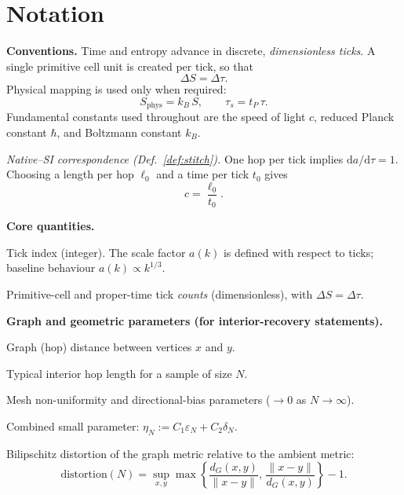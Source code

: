 \section*{Notation}

\noindent\textbf{Conventions.}  
Time and entropy advance in discrete, \emph{dimensionless ticks}.   
A single primitive cell unit is created per tick, so that
\[
  \Delta S = \Delta \tau.
\]
Physical mapping is used only when required:
\[
  S_{\mathrm{phys}} = k_B\,S, \qquad \tau_s = t_P\,\tau.
\]
Fundamental constants used throughout are the speed of light \(c\), reduced Planck constant \(\hbar\), and Boltzmann constant \(k_B\).

\smallskip
\noindent\textit{Native--SI correspondence (Def.~\ref{def:stitch}).}  
One hop per tick implies \(\mathrm{d}a/\mathrm{d}\tau = 1\).  
Choosing a length per hop \(\ell_0\) and a time per tick \(t_0\) gives
\[
  c = \frac{\ell_0}{t_0}.
\]

\bigskip
\noindent\textbf{Core quantities.}
\begin{description}[leftmargin=2.4em,labelsep=0.8em]
  \item[\(k\)] Tick index (integer). The scale factor \(a(k)\) is defined with respect to ticks; baseline behaviour \(a(k) \propto k^{1/3}\).
  \item[\(\Delta S,\, \Delta\tau\)] Primitive-cell and proper-time tick \emph{counts} (dimensionless), with \(\Delta S = \Delta\tau\).
\end{description}

\noindent\textbf{Graph and geometric parameters (for interior-recovery statements).}
\begin{description}[leftmargin=2.4em,labelsep=0.8em]
  \item[\(d_G(x,y)\)] Graph (hop) distance between vertices \(x\) and \(y\).
  \item[\(\ell_N\)] Typical interior hop length for a sample of size \(N\).
  \item[\(\varepsilon_N,\,\delta_N\)] Mesh non-uniformity and directional-bias parameters (\(\to 0\) as \(N \to \infty\)).
  \item[\(\eta_N\)] Combined small parameter: \(\eta_N := C_1\varepsilon_N + C_2\delta_N.\)
  \item[\(\mathrm{distortion}(N)\)] Bilipschitz distortion of the graph metric relative to the ambient metric:
  \[
    \mathrm{distortion}(N)
      = \sup_{x,y} 
        \max\!\left\{
          \frac{d_G(x,y)}{\|x-y\|},\,
          \frac{\|x-y\|}{d_G(x,y)}
        \right\} - 1.
  \]
\end{description}

